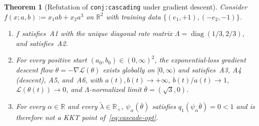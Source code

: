 \documentclass[11pt]{article}
\theoremstyle{plain}
\newtheorem{theorem}{Theorem}
\theoremstyle{definition}
\theoremstyle{remark}
\DeclareMathOperator{\diag}{diag}
\begin{document}
\begin{theorem}[Refutation of \texttt{conj:cascading} under gradient descent]\label{thm:descent}
Consider $f(x; a, b) := x_1 ab + x_2 a^3$ on $\mathbb{R}^2$ with training data $\{(e_1, +1), (-e_2, -1)\}$.
\begin{enumerate}[label=\textup{(\arabic*)}]
\item $f$ satisfies~A1 with the unique diagonal rate matrix $\Lambda = \diag(1/3, 2/3)$, and satisfies~A2.
\item For every positive start $(a_0, b_0) \in (0, \infty)^2$, the exponential-loss gradient descent flow $\dot{\theta} = -\nabla \mathcal{L}(\theta)$ exists globally on $[0, \infty)$ and satisfies~A3, A4 (descent), A5, and~A6, with $a(t), b(t) \to +\infty$, $b(t)/a(t) \to 1$, $\mathcal{L}(\theta(t)) \to 0$, and $\Lambda$-normalized limit $\bar{\theta} = (\sqrt{3}, 0)$.
\item For every $\alpha \in \mathbb{R}$ and every $\tilde{\lambda} \in \mathbb{R}_+$, $\psi_\alpha(\bar{\theta})$ satisfies $q_1(\psi_\alpha \bar{\theta}) = 0 < 1$ and is therefore not a KKT point of~\eqref{eq:cascade-opt}.
\end{enumerate}
\end{theorem}
\end{document}
